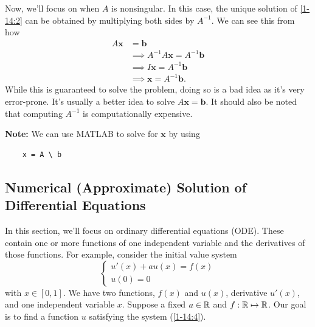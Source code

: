 \documentclass[letterpaper]{article}
\newcommand{\mb}{\mathbf{b}}
\newcommand{\mx}{\mathbf{x}}
\begin{document}
Now, we'll focus on when $A$ is nonsingular. In this case, the unique solution of \ref{1-14:2} can be obtained by multiplying both sides by $A^{-1}$. We can see this from how 
\begin{equation*}
    \begin{aligned}
        A\mx &= \mb \\ 
            &\implies A^{-1} A \mx = A^{-1} \mb \\ 
            &\implies I\mx = A^{-1}\mb \\ 
            &\implies \mx = A^{-1}\mb. 
    \end{aligned}
\end{equation*}
While this is guaranteed to solve the problem, doing so is a bad idea as it's very error-prone. It's usually a better idea to solve $A\mx = \mb$. It should also be noted that computing $A^{-1}$ is computationally expensive.

\bigskip 

\textbf{Note:} We can use MATLAB to solve for $\mx$ by using 
\begin{verbatim}
    x = A \ b\end{verbatim}

\subsection{Numerical (Approximate) Solution of Differential Equations}
In this section, we'll focus on ordinary differential equations (ODE). These contain one or more functions of one independent variable and the derivatives of those functions. For example, consider the initial value system 
\begin{equation}\label{1-14:4}
    \begin{cases}
        u'(x) + au(x) = f(x) \\ 
        u(0) = 0
    \end{cases}
\end{equation}
with $x \in [0, 1]$. We have two functions, $f(x)$ and $u(x)$, derivative $u'(x)$, and one independent variable $x$. Suppose a fixed $a \in \mathbb{R}$ and $f: \mathbb{R} \mapsto \mathbb{R}$. Our goal is to find a function $u$ satisfying the system (\ref{1-14:4}).
\end{document}
